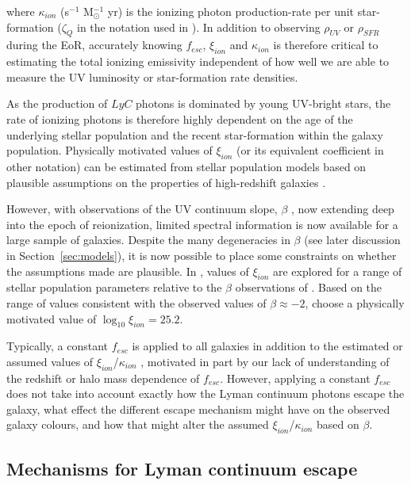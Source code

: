 \noindent where $\kappa_{ion}$ (s$^{-1}$ M$_{\odot}^{-1}$ yr) is the ionizing photon production-rate per unit star-formation ($\zeta_{Q}$ in the notation used in \citet{2010Natur.468...49R}). In addition to observing $\rho_{UV}$ or $\rho_{SFR}$ during the EoR, accurately knowing $f_{esc}$, $\xi_{ion}$ and $\kappa_{ion}$ is therefore critical to estimating the total ionizing emissivity independent of how well we are able to measure the UV luminosity or star-formation rate densities.

As the production of $LyC$ photons is dominated by young UV-bright stars, the rate of ionizing photons is therefore highly dependent on the age of the underlying stellar population and the recent star-formation within the galaxy population. Physically motivated values of $\xi_{ion}$ (or its equivalent coefficient in other notation) can be estimated from stellar population models based on plausible assumptions on the properties of high-redshift galaxies \citep{Bolton:2007gc,Ouchi:2009jd,Kuhlen:2012ka}. 

However, with observations of the UV continuum slope, $\beta$ \citep{1994ApJ...429..582C}, now extending deep into the epoch of reionization, limited spectral information is now available for a large sample of galaxies. Despite the many degeneracies in $\beta$ (see later discussion in Section~\ref{sec:models}), it is now possible to place some constraints on whether the assumptions made are plausible. In \citet{Robertson:2013ji}, values of $\xi_{ion}$ are explored for a range of stellar population parameters relative to the $\beta$ observations of \citet{Dunlop:2013kp}. Based on the range of values consistent with the observed values of $\beta \approx -2$, \citeauthor{Robertson:2013ji} choose a physically motivated value of $\log_{10}\xi_{ion} = 25.2$. 

Typically, a constant $f_{esc}$ is applied to all galaxies in addition to the estimated or assumed values of $\xi_{ion}$/$\kappa_{ion}$ \citep{Ouchi:2009jd,Finkelstein:2012hr,Robertson:2013ji}, motivated in part by our lack of understanding of the redshift or halo mass dependence of $f_{esc}$. However, applying a constant $f_{esc}$ does not take into account exactly how the Lyman continuum photons escape the galaxy, what effect the different escape mechanism might have on the observed galaxy colours, and how that might alter the assumed $\xi_{ion}$/$\kappa_{ion}$ based on $\beta$. 

\subsection{Mechanisms for Lyman continuum escape}\label{sec:escape_mechanisms}

